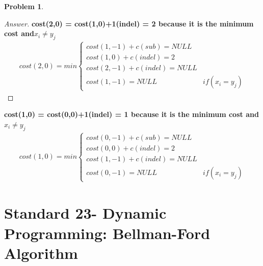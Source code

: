 \documentclass[11pt]{article}
\theoremstyle{definition}
\theoremstyle{definition}
\newtheorem{required}{Problem}
\theoremstyle{definition}
\begin{document}
\begin{required}
\begin{proof}[Answer]
\textbf{cost(2,0) = cost(1,0)+1(indel) = 2 because it is the minimum cost and$ x_i \neq y_j$}\\
\begin{align*}
cost(2,0) = min\begin{cases}
cost(1,-1) + c(sub) = NULL \\
cost(1,0) + c(indel) = 2\\
cost(2,-1) + c(indel) = NULL\\
cost(1,-1) = NULL & if (x_i = y_j)
\end{cases}
\end{align*}
\end{proof}
\newpage
\textbf{cost(1,0) = cost(0,0)+1(indel) = 1 because it is the minimum cost and$ x_i \neq y_j$}\\
\begin{align*}
cost(1,0) = min\begin{cases}
cost(0,-1) + c(sub) = NULL \\
cost(0,0) + c(indel) = 2\\
cost(1,-1) + c(indel) = NULL\\
cost(0,-1) = NULL & if (x_i = y_j)
\end{cases}
\end{align*}
\end{required}

\newpage
\section{Standard 23- Dynamic Programming: Bellman-Ford Algorithm}
\end{document}

